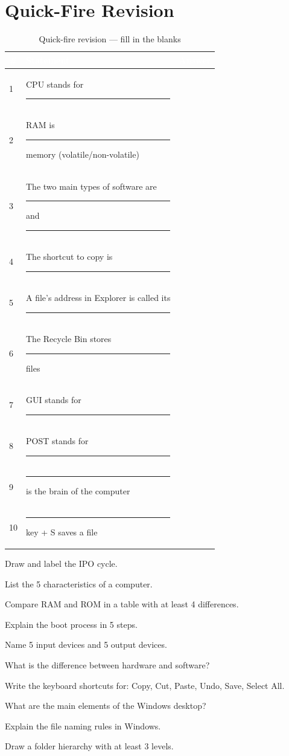 \section{Quick-Fire Revision}
\label{sec:quickfire}

\begin{table}[H]
\centering
\caption{Quick-fire revision --- fill in the blanks}
\label{tab:revision-blanks}
\renewcommand{\arraystretch}{1.4}
\begin{tabularx}{\textwidth}{l X l}
\toprule
\rowcolor{HeaderRow}
\textcolor{white}{\textbf{\#}} & \textcolor{white}{\textbf{Statement}} & \textcolor{white}{\textbf{Answer}} \\
\midrule
\rowcolor{RowLight} 1 & CPU stands for \rule{4cm}{0.4pt} & \\
\rowcolor{RowDark} 2 & RAM is \rule{2cm}{0.4pt} memory (volatile/non-volatile) & \\
\rowcolor{RowLight} 3 & The two main types of software are \rule{2cm}{0.4pt} and \rule{2cm}{0.4pt} & \\
\rowcolor{RowDark} 4 & The shortcut to copy is \rule{3cm}{0.4pt} & \\
\rowcolor{RowLight} 5 & A file's address in Explorer is called its \rule{2cm}{0.4pt} & \\
\rowcolor{RowDark} 6 & The Recycle Bin stores \rule{3cm}{0.4pt} files & \\
\rowcolor{RowLight} 7 & GUI stands for \rule{4cm}{0.4pt} & \\
\rowcolor{RowDark} 8 & POST stands for \rule{4cm}{0.4pt} & \\
\rowcolor{RowLight} 9 & \rule{2cm}{0.4pt} is the brain of the computer & \\
\rowcolor{RowDark} 10 & \rule{2cm}{0.4pt} key + S saves a file & \\
\bottomrule
\end{tabularx}
\end{table}

\begin{reviewqs}
  \item Draw and label the IPO cycle.
  \item List the 5 characteristics of a computer.
  \item Compare RAM and ROM in a table with at least 4 differences.
  \item Explain the boot process in 5 steps.
  \item Name 5 input devices and 5 output devices.
  \item What is the difference between hardware and software?
  \item Write the keyboard shortcuts for: Copy, Cut, Paste, Undo, Save, Select All.
  \item What are the main elements of the Windows desktop?
  \item Explain the file naming rules in Windows.
  \item Draw a folder hierarchy with at least 3 levels.
\end{reviewqs}

